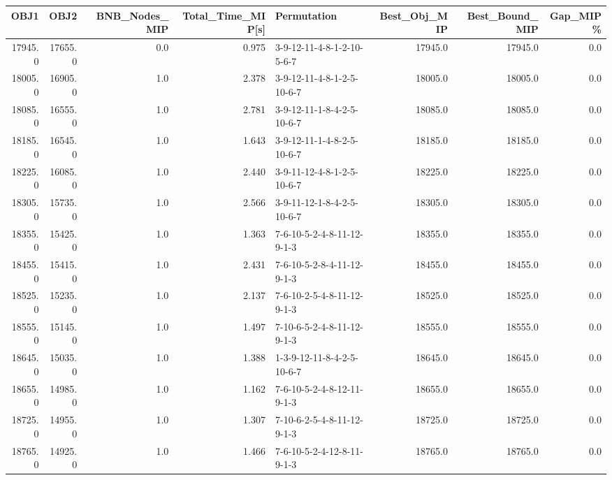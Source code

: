 \begin{tabular}{rrrrlrrr}
\toprule
    OBJ1 &     OBJ2 &  BNB\_Nodes\_MIP &  Total\_Time\_MIP[s] &                 Permutation &  Best\_Obj\_MIP &  Best\_Bound\_MIP &  Gap\_MIP\% \\
\midrule
 17945.0 &  17655.0 &            0.0 &              0.975 &  3-9-12-11-4-8-1-2-10-5-6-7 &       17945.0 &         17945.0 &       0.0 \\
 18005.0 &  16905.0 &            1.0 &              2.378 &  3-9-12-11-4-8-1-2-5-10-6-7 &       18005.0 &         18005.0 &       0.0 \\
 18085.0 &  16555.0 &            1.0 &              2.781 &  3-9-12-11-1-8-4-2-5-10-6-7 &       18085.0 &         18085.0 &       0.0 \\
 18185.0 &  16545.0 &            1.0 &              1.643 &  3-9-12-11-1-4-8-2-5-10-6-7 &       18185.0 &         18185.0 &       0.0 \\
 18225.0 &  16085.0 &            1.0 &              2.440 &  3-9-11-12-4-8-1-2-5-10-6-7 &       18225.0 &         18225.0 &       0.0 \\
 18305.0 &  15735.0 &            1.0 &              2.566 &  3-9-11-12-1-8-4-2-5-10-6-7 &       18305.0 &         18305.0 &       0.0 \\
 18355.0 &  15425.0 &            1.0 &              1.363 &  7-6-10-5-2-4-8-11-12-9-1-3 &       18355.0 &         18355.0 &       0.0 \\
 18455.0 &  15415.0 &            1.0 &              2.431 &  7-6-10-5-2-8-4-11-12-9-1-3 &       18455.0 &         18455.0 &       0.0 \\
 18525.0 &  15235.0 &            1.0 &              2.137 &  7-6-10-2-5-4-8-11-12-9-1-3 &       18525.0 &         18525.0 &       0.0 \\
 18555.0 &  15145.0 &            1.0 &              1.497 &  7-10-6-5-2-4-8-11-12-9-1-3 &       18555.0 &         18555.0 &       0.0 \\
 18645.0 &  15035.0 &            1.0 &              1.388 &  1-3-9-12-11-8-4-2-5-10-6-7 &       18645.0 &         18645.0 &       0.0 \\
 18655.0 &  14985.0 &            1.0 &              1.162 &  7-6-10-5-2-4-8-12-11-9-1-3 &       18655.0 &         18655.0 &       0.0 \\
 18725.0 &  14955.0 &            1.0 &              1.307 &  7-10-6-2-5-4-8-11-12-9-1-3 &       18725.0 &         18725.0 &       0.0 \\
 18765.0 &  14925.0 &            1.0 &              1.466 &  7-6-10-5-2-4-12-8-11-9-1-3 &       18765.0 &         18765.0 &       0.0 \\

\end{tabular}
